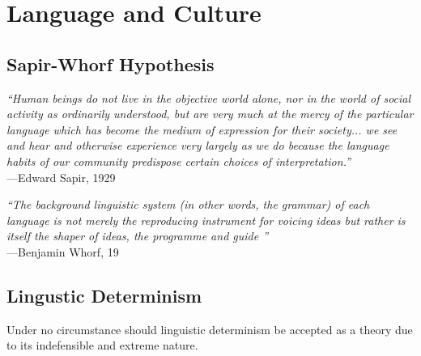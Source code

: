 \documentclass[../main.tex]{subfiles}
\begin{document}
    \section{Language and Culture}
    \subsection{Sapir-Whorf Hypothesis}
        {\it ``Human beings do not live in the objective world alone, nor in the world of social activity as ordinarily understood, but are very much at the mercy of the particular language which has become the medium of expression for their society... we see and hear and otherwise experience very largely as we do because the language habits of our community predispose certain choices of interpretation.''} \\ \hfill ---Edward Sapir, 1929 \par 
        {\it ``The background linguistic system (in other words, the grammar) of each language is not merely the reproducing instrument for voicing ideas but rather is itself the shaper of ideas, the programme and guide ''} \\ \hfill ---Benjamin Whorf, 19 \par 
        
        \subsection{Lingustic Determinism}
            Under no circumstance should linguistic determinism be accepted as a theory due to its indefensible and extreme nature.
        
\end{document}

